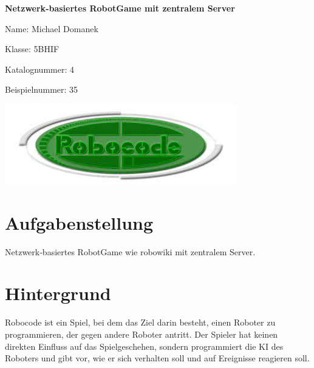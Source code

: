 \documentclass{article}
\begin{document}
    \begin{titlepage}
       \begin{center}
            \vspace*{1cm}
    
            \huge
            \textbf{Netzwerk‐basiertes RobotGame mit zentralem Server}
        \end{center}
    
        \vspace{1.5cm}
        \begin{addmargin}[8em]{0em}
            \Large
            Name: Michael Domanek\par
            Klasse: 5BHIF\par
            Katalognummer: 4\par
            Beispielnummer: 35
        \end{addmargin}
        
        \vfill
        
        \begin{center} 
        \includegraphics[width=\textwidth]{Robocode}
                
        \end{center}
    \end{titlepage}

\newpage

\tableofcontents

\newpage

\section{Aufgabenstellung}
Netzwerk‐basiertes RobotGame wie robowiki mit zentralem Server.

\section{Hintergrund}

Robocode ist ein Spiel, bei dem das Ziel darin besteht, einen Roboter zu programmieren, der gegen andere Roboter antritt. Der Spieler hat keinen direkten Einfluss auf das Spielgeschehen, sondern programmiert die KI des Roboters und gibt vor, wie er sich verhalten soll und auf Ereignisse reagieren soll. 
\end{document}
